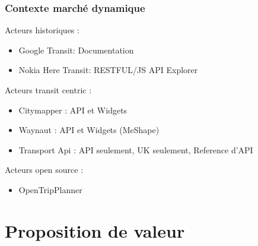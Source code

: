 \documentclass[table]{beamer}
\begin{document}
\begin{frame}
  \frametitle{Contexte marché dynamique}
  \begin{description}
    \item[Acteurs historiques : ]
  \end{description}
  \begin{itemize}
    \item Google Transit: Documentation
    \item Nokia Here Transit: RESTFUL/JS API Explorer
  \end{itemize}
    \begin{description}
    \item[Acteurs transit centric : ]
  \end{description}
  \begin{itemize}
    \item Citymapper : API et Widgets 
    \item Waynaut  :  API et Widgets (MeShape)
    \item Transport Api : API seulement, UK seulement, Reference d'API
  \end{itemize}
  \begin{description}
    \item[Acteurs open source : ]
  \end{description}
  \begin{itemize}
    \item OpenTripPlanner
  \end{itemize}
\end{frame}

\section{Proposition de valeur}
\end{document}
